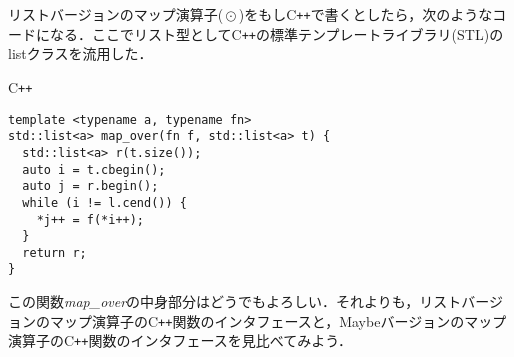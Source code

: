 \documentclass[a5paper,draft]{jsbook}
\newcommand{\programminglanguage}[1]{\textsf{#1}}
\newcommand{\cxx}{\programminglanguage{C}\texttt{++}}
\newenvironment{cxxcode}{\begin{itembox}[r]{\cxx}}{\end{itembox}}
\newcommand{\pthnClassname}[1]{\textrm{#1}}
\newcommand{\pthnId}[1]{\textit{#1}}
\newcommand{\pthnKeyword}[1]{\textbf{#1}}
\newcommand{\pthnOp}[1]{\texttt{#1}}
\DeclareMathOperator{\hsklMap}{\odot}
\begin{document}
リストバージョンのマップ演算子($\hsklMap$)をもし\cxx で書くとしたら，次のようなコードになる．ここでリスト型として\cxx の標準テンプレートライブラリ(STL)の\pthnClassname{list}クラスを流用した．
\begin{cxxcode}
\begin{verbatim}
template <typename a, typename fn>
std::list<a> map_over(fn f, std::list<a> t) {
  std::list<a> r(t.size());
  auto i = t.cbegin();
  auto j = r.begin();
  while (i != l.cend()) {
    *j++ = f(*i++);
  }
  return r;
}
\end{verbatim}
\end{cxxcode}
この関数\pthnId{map\_over}の中身部分はどうでもよろしい．それよりも，リストバージョンのマップ演算子の\cxx 関数のインタフェースと，Maybeバージョンのマップ演算子の\cxx 関数のインタフェースを見比べてみよう．
\end{document}
